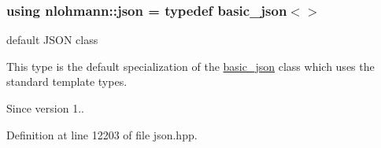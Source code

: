 \subsubsection[{json}]{\setlength{\rightskip}{0pt plus 5cm}using {\bf nlohmann\+::json} = typedef {\bf basic\+\_\+json}$<$$>$}\label{namespacenlohmann_a2bfd99e845a2e5cd90aeaf1b1431f474}


default J\+S\+O\+N class 

This type is the default specialization of the \hyperlink{classnlohmann_1_1basic__json}{basic\+\_\+json} class which uses the standard template types.

\begin{DoxySince}{Since}
version 1.. 
\end{DoxySince}


Definition at line 12203 of file json.\+hpp.


